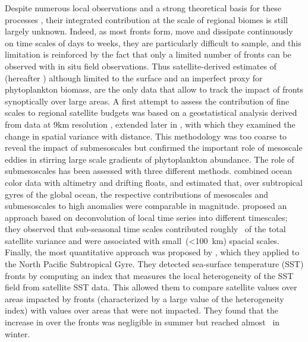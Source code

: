 Despite numerous local observations and a strong theoretical basis for these processes \parencite[e.g.\ recent studies by][]{marrec_2018, little_2018, verneil_2019, ruiz_2019, uchida_2020, kessouri_2020, tzortzis_2021}, their integrated contribution at the scale of regional biomes is still largely unknown.
Indeed, as most fronts form, move and dissipate continuously on time scales of days to weeks, they are particularly difficult to sample, and this limitation is reinforced by the fact that only a limited number of fronts can be observed with in situ field observations.
Thus satellite-derived estimates of  (hereafter ) although limited to the surface and an imperfect proxy for phytoplankton biomass, are the only data that allow to track the impact of fronts synoptically over large areas.
A first attempt to assess the contribution of fine scales to regional satellite  budgets was based on a geostatistical analysis derived from data at 9km resolution \parencite{doney_2003}, extended later in \textcite{glover_2018}, with which they examined the change in spatial variance with distance.
This methodology was too coarse to reveal the impact of submesoscales but confirmed the important role of mesoscale eddies in stirring large scale gradients of phytoplankton abundance.
The role of submesoscales has been assessed with three different methods.
\textcite{guo_2019} combined ocean color data with altimetry and drifting floats, and estimated that, over subtropical gyres of the global ocean, the respective contributions of mesoscales and submesoscales to high  anomalies were comparable in magnitude.
\textcite{keerthi_2022} proposed an approach based on deconvolution of local  time series into different timescales; they observed that sub-seasonal time scales contributed roughly~ of the total satellite  variance and were associated with small~(\qty{<100}{\km}) spacial scales.
Finally, the most quantitative approach was proposed by \textcite{liu_2016}, which they applied to the North Pacific Subtropical Gyre.
They detected sea-surface temperature (SST) fronts by computing an index that measures the local heterogeneity of the SST field from satellite SST data.
This allowed them to compare satellite  values over areas impacted by fronts (characterized by a large value of the heterogeneity index) with values over areas that were not impacted.
They found that the increase in  over the fronts was negligible in summer but reached almost~ in winter.

